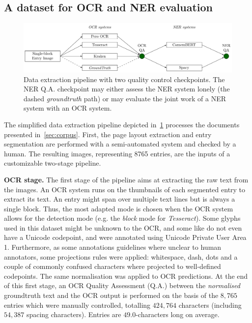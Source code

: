 \subsection{A dataset for OCR and NER evaluation}
\label{sec:dataset-for-eval}

\begin{figure}[tb]
    \includegraphics[width=\linewidth]{figs/protocol.pdf}
    \caption{Data extraction pipeline with two quality control checkpoints. The
    NER Q.A. checkpoint may either assess the NER system lonely (the dashed
    \emph{groundtruth} path) or may evaluate the joint work of a NER
    system with an OCR system.}
    \label{fig.pipeline}
\end{figure}


The simplified data extraction pipeline depicted in~\cref{fig.pipeline} processes the documents presented
in~\cref{sec:corpus}. First, the page layout extraction and entry segmentation are performed with a
semi-automated system and checked by a human. The resulting images, representing 8765 entries, are the inputs of a customizable two-stage pipeline.

\textbf{OCR stage.} The first stage of the pipeline aims at extracting the raw text from the images. An OCR system runs
on the thumbnails of each segmented entry to extract its text. An entry might span over multiple text lines but is
always a single block. Thus, the most adapted mode is chosen when the OCR system allows for the detection mode (e.g. the
\emph{block} mode for \emph{Tesseract}). 
Some glyphs used in this dataset might be unknown to the OCR, and some like
 do not even have a Unicode codepoint, and were annotated using Unicode Private User Area 1.
Furthermore, as some annotations guidelines where unclear to human annotators, some projections rules were applied: whitespace, dash, dots and a couple of commonly confused characters where projected to well-defined codepoints.
The same normalisation was applied to OCR predictions.
At the end of this first stage, an OCR Quality Assessment (Q.A.) between the \emph{normalised} groundtruth text and the
OCR output is performed on the basis of the $8,765$ entries which were manually controlled, totalling $424,764$ characters (including $54,387$ spacing characters). Entries are $49.0$-characters long on average.


